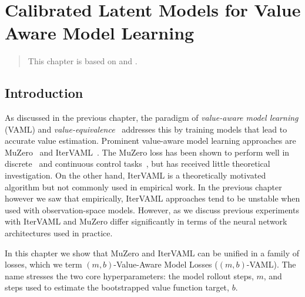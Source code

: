 \chapter{Calibrated Latent Models for Value Aware Model Learning}
\label{chap:cvaml}

\begin{quote}
    This chapter is based on  and .
\end{quote}

\newcommand{\rev}[1]{#1}

\section{Introduction}
As discussed in the previous chapter, the paradigm of \emph{value-aware model learning} (VAML) \parencite{vaml} and \emph{value-equivalence}~\parencite{grimm2020value,grimm2021proper} addresses this by training models that lead to accurate value estimation.
Prominent value-aware model learning approaches are MuZero~\parencite{schrittwieser2020mastering} and IterVAML~\parencite{itervaml}.
The MuZero loss has been shown to perform well in discrete~\parencite{schrittwieser2020mastering,ye2021mastering} and continuous control tasks~\parencite{hansen2022temporal,hansen2024tdmpc}, but has received little theoretical investigation.
On the other hand, IterVAML is a theoretically motivated algorithm but not commonly used in empirical work.
In the previous chapter however we saw that empirically, IterVAML approaches tend to be unstable when used with observation-space models.
However, as we discuss previous experiments with IterVAML and MuZero differ significantly in terms of the neural network architectures used in practice.

In this chapter we show that MuZero and IterVAML can be unified in a family of losses, which we term $(m,b)$-Value-Aware Model Losses ($(m,b)$-VAML).
The name stresses the two core hyperparameters: the model rollout steps, $m$, and steps used to estimate the bootstrapped value function target, $b$.


